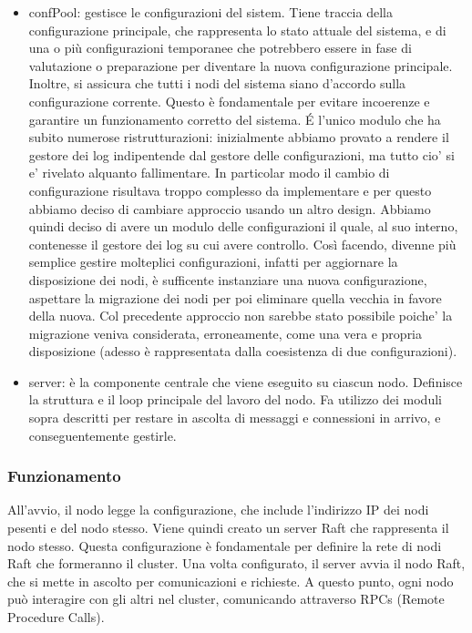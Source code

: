 \begin{itemize}
  \item confPool: gestisce le configurazioni del sistem. Tiene traccia della configurazione principale, che rappresenta lo stato attuale del sistema, e di una o più configurazioni temporanee che potrebbero essere in fase di 
    valutazione o preparazione per diventare la nuova configurazione principale. Inoltre, si assicura che tutti i nodi del sistema siano d'accordo sulla configurazione corrente. Questo è fondamentale per evitare 
    incoerenze e garantire un funzionamento corretto del sistema. \'E l'unico modulo che ha subito numerose ristrutturazioni: inizialmente abbiamo provato a rendere il gestore dei log indipentende dal gestore delle configurazioni, 
    ma tutto cio' si e' rivelato alquanto fallimentare. In particolar modo il cambio di configurazione risultava troppo complesso da implementare e per questo abbiamo deciso di cambiare approccio usando un altro design. Abbiamo 
    quindi deciso di avere un modulo delle configurazioni il quale, al suo interno, contenesse il gestore dei log su cui avere controllo. Così facendo, divenne più semplice gestire molteplici configurazioni, infatti per aggiornare
    la disposizione dei nodi, è sufficente instanziare una nuova configurazione, aspettare la migrazione dei nodi per poi eliminare quella vecchia in favore della nuova. 
    Col precedente approccio non sarebbe stato possibile poiche' la migrazione veniva 
    considerata, erroneamente, come una vera e propria disposizione (adesso è rappresentata dalla coesistenza di due configurazioni). 
  
  \item server: è la componente centrale che viene eseguito su ciascun nodo. Definisce la struttura e il loop principale del lavoro del nodo. Fa utilizzo dei moduli sopra descritti per restare in ascolta di messaggi e connessioni 
    in arrivo, e conseguentemente gestirle.

\end{itemize}


\subsubsection{Funzionamento}
All'avvio, il nodo legge la configurazione, che include l'indirizzo IP dei nodi pesenti e del nodo stesso. Viene quindi creato un server Raft che rappresenta il nodo stesso. Questa configurazione è fondamentale per definire la 
rete di nodi Raft che formeranno il cluster.
Una volta configurato, il server avvia il nodo Raft, che si mette in ascolto per comunicazioni e richieste. A questo punto, ogni nodo può interagire con gli altri nel cluster, comunicando attraverso RPCs (Remote Procedure Calls).

